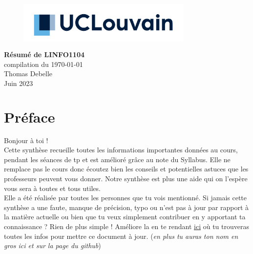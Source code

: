 \documentclass{report}
\begin{document}
\begin{titlepage}
    \begin{figure}
        \includegraphics[height = 2cm]{UCL_Logo.png}
        \label{fig:my_label}
    \end{figure}

    \hspace*{100cm}
    \centering
    \vspace*{7cm}

    {\Huge \textbf{Résumé de LINFO1104}}\\
    \vspace*{0.25cm}
    compilation du \today\\
    \vspace*{0.25cm}
    \Large{Thomas Debelle}\\

    \vspace*{9.5cm}
    {\Large Juin 2023}
\end{titlepage}


\tableofcontents
\newpage

\section*{Préface}

Bonjour à toi !\\

Cette synthèse recueille toutes les informations importantes données au cours, pendant les séances de tp et est amélioré grâce au note du Syllabus. Elle ne remplace pas le cours donc écoutez bien les conseils et potentielles astuces que les professeurs peuvent vous donner. Notre synthèse est plus une aide qui on l'espère vous sera à toutes et tous utiles.\\

Elle a été réalisée par toutes les personnes que tu vois mentionné. Si jamais cette synthèse a une faute, manque de précision, typo ou n'est pas à jour par rapport à la matière actuelle ou bien que tu veux simplement contribuer en y apportant ta connaissance ? Rien de plus simple ! Améliore la en te rendant \href{http://www.github.com/Tfloow/Q4_EPL}{ici} où tu trouveras toutes les infos pour mettre ce document à jour. (\textit{en plus tu auras ton nom en gros ici et sur la page du github})\\
\end{document}
